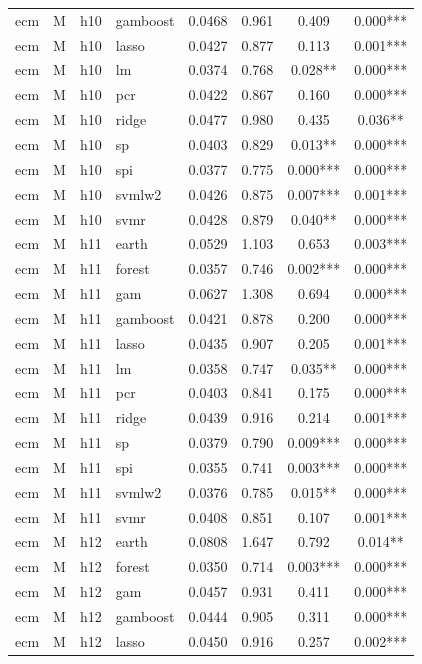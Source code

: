 \begin{ThreePartTable}
\begin{longtable}[t]{llclcccc}
ecm & M & h10 & gamboost & 0.0468 & 0.961 & 0.409 & 0.000***\\
ecm & M & h10 & lasso & 0.0427 & 0.877 & 0.113 & 0.001***\\
ecm & M & h10 & lm & 0.0374 & 0.768 & 0.028** & 0.000***\\
ecm & M & h10 & pcr & 0.0422 & 0.867 & 0.160 & 0.000***\\
ecm & M & h10 & ridge & 0.0477 & 0.980 & 0.435 & 0.036**\\
ecm & M & h10 & sp & 0.0403 & 0.829 & 0.013** & 0.000***\\
ecm & M & h10 & spi & 0.0377 & 0.775 & 0.000*** & 0.000***\\
ecm & M & h10 & svmlw2 & 0.0426 & 0.875 & 0.007*** & 0.001***\\
ecm & M & h10 & svmr & 0.0428 & 0.879 & 0.040** & 0.000***\\
\addlinespace
ecm & M & h11 & earth & 0.0529 & 1.103 & 0.653 & 0.003***\\
ecm & M & h11 & forest & 0.0357 & 0.746 & 0.002*** & 0.000***\\
ecm & M & h11 & gam & 0.0627 & 1.308 & 0.694 & 0.000***\\
ecm & M & h11 & gamboost & 0.0421 & 0.878 & 0.200 & 0.000***\\
ecm & M & h11 & lasso & 0.0435 & 0.907 & 0.205 & 0.001***\\
ecm & M & h11 & lm & 0.0358 & 0.747 & 0.035** & 0.000***\\
ecm & M & h11 & pcr & 0.0403 & 0.841 & 0.175 & 0.000***\\
ecm & M & h11 & ridge & 0.0439 & 0.916 & 0.214 & 0.001***\\
ecm & M & h11 & sp & 0.0379 & 0.790 & 0.009*** & 0.000***\\
ecm & M & h11 & spi & 0.0355 & 0.741 & 0.003*** & 0.000***\\
ecm & M & h11 & svmlw2 & 0.0376 & 0.785 & 0.015** & 0.000***\\
ecm & M & h11 & svmr & 0.0408 & 0.851 & 0.107 & 0.001***\\
\addlinespace
ecm & M & h12 & earth & 0.0808 & 1.647 & 0.792 & 0.014**\\
ecm & M & h12 & forest & 0.0350 & 0.714 & 0.003*** & 0.000***\\
ecm & M & h12 & gam & 0.0457 & 0.931 & 0.411 & 0.000***\\
ecm & M & h12 & gamboost & 0.0444 & 0.905 & 0.311 & 0.000***\\
ecm & M & h12 & lasso & 0.0450 & 0.916 & 0.257 & 0.002***\\

\end{longtable}
\end{ThreePartTable}

